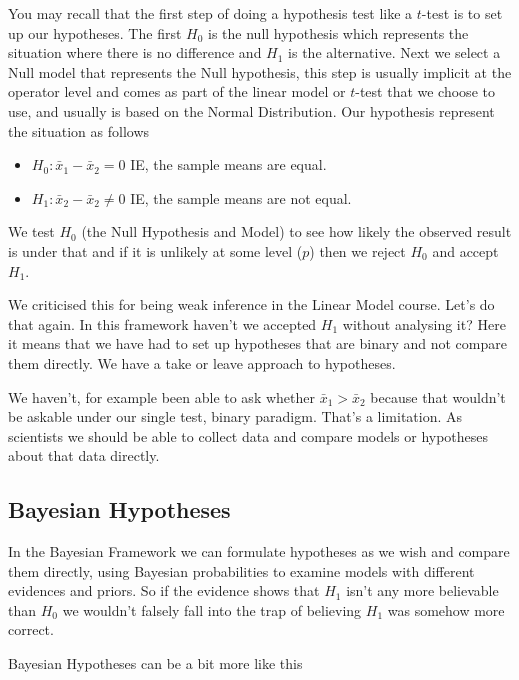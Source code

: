 \documentclass[
]{book}
\providecommand{\tightlist}{%
  \setlength{\itemsep}{0pt}\setlength{\parskip}{0pt}}
\begin{document}
You may recall that the first step of doing a hypothesis test like a \(t\)-test is to set up our hypotheses. The first \(H_0\) is the null hypothesis which represents the situation where there is no difference and \(H_1\) is the alternative. Next we select a Null model that represents the Null hypothesis, this step is usually implicit at the operator level and comes as part of the linear model or \(t\)-test that we choose to use, and usually is based on the Normal Distribution. Our hypothesis represent the situation as follows

\begin{itemize}
\tightlist
\item
  \(H_0 : \bar{x}_1 - \bar{x}_2 = 0\) IE, the sample means are equal.
\item
  \(H_1 : \bar{x}_2 - \bar{x}_2 \neq 0\) IE, the sample means are not equal.
\end{itemize}

We test \(H_0\) (the Null Hypothesis and Model) to see how likely the observed result is under that and if it is unlikely at some level (\(p\)) then we reject \(H_0\) and accept \(H_1\).

We criticised this for being weak inference in the Linear Model course. Let's do that again. In this framework haven't we accepted \(H_1\) without analysing it? Here it means that we have had to set up hypotheses that are binary and not compare them directly. We have a take or leave approach to hypotheses.

We haven't, for example been able to ask whether \(\bar{x}_1 > \bar{x}_2\) because that wouldn't be askable under our single test, binary paradigm. That's a limitation. As scientists we should be able to collect data and compare models or hypotheses about that data directly.

\hypertarget{bayesian-hypotheses}{%
\subsection{Bayesian Hypotheses}\label{bayesian-hypotheses}}

In the Bayesian Framework we can formulate hypotheses as we wish and compare them directly, using Bayesian probabilities to examine models with different evidences and priors. So if the evidence shows that \(H_1\) isn't any more believable than \(H_0\) we wouldn't falsely fall into the trap of believing \(H_1\) was somehow more correct.

Bayesian Hypotheses can be a bit more like this
\end{document}
